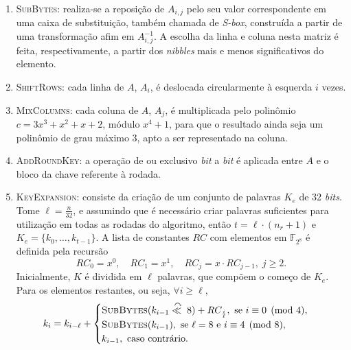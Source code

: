 \documentclass{ufsctex/ufsctex}
\begin{document}
\begin{enumerate}[labelsep=0.5em, label=\roman*.]

  \item \textsc{SubBytes}: realiza-se a reposição de $A_{i, j}$ pelo seu valor
      correspondente em uma caixa de substituição, também chamada de
        \emph{S-box}, construída a partir de uma transformação afim em $A_{i,
        j}^{-1}$. A escolha da linha e coluna nesta matriz é feita,
        respectivamente, a partir dos \emph{nibbles} mais e menos
        significativos do elemento.

  \item \textsc{ShiftRows}: cada linha de $A$, $A_{i}$, é deslocada
      circularmente à esquerda $i$ vezes.

  \item \textsc{MixColumns}: cada coluna de $A$, $A_{j}$, é multiplicada pelo
      polinômio $c = 3x^{3} + x^{2} + x + 2$, módulo $x^{4} + 1$, para que o
        resultado ainda seja um polinômio de grau máximo 3, apto a ser
        representado na coluna.

  \item \textsc{AddRoundKey}: a operação de ou exclusivo \emph{bit} a
      \emph{bit} é aplicada entre $A$ e o bloco da chave referente à rodada.

  \item \textsc{KeyExpansion}: consiste da criação de um conjunto de palavras
      $K_{e}$ de 32 \emph{bits}. Tome $\ell = \frac{n}{32}$, e assumindo que é
        necessário criar palavras suficientes para utilização em todas as
        rodadas do algoritmo, então $t = \ell \cdot (n_{r} + 1)$ e $K_{e} =
        \{k_{0}, \dots, k_{t - 1}\}$. A lista de constantes $RC$ com elementos
        em $\mathbb{F}_{2^{8}}$ é definida pela recursão
        \begin{equation}
          RC_{0} = x^{0}, \quad RC_{1} = x^{1}, \quad
          RC_{j} = x \cdot RC_{j - 1}, \; j \geq 2.
        \end{equation}
        Inicialmente, $K$ é dividida em $\ell$ palavras, que compõem o começo
        de $K_{e}$. Para os elementos restantes, ou seja, $\forall i \geq \ell$,
        \begin{equation}
          k_{i} = k_{i - \ell} +
          \begin{cases}
            \textsc{SubBytes}(k_{i - 1}
              \stackrel{\curvearrowright}{\ll{}} 8) + RC_{\frac{i}{\ell}},
              \text{ se } i \equiv 0 \pmod{4}, \\
            \textsc{SubBytes}(k_{i - 1}),
              \text{ se } \ell = 8 \text { e } i \equiv 4 \pmod{8}, \\
            k_{i - 1}, \text{ caso contrário.}
          \end{cases}
        \end{equation}

\end{enumerate}
\end{document}
